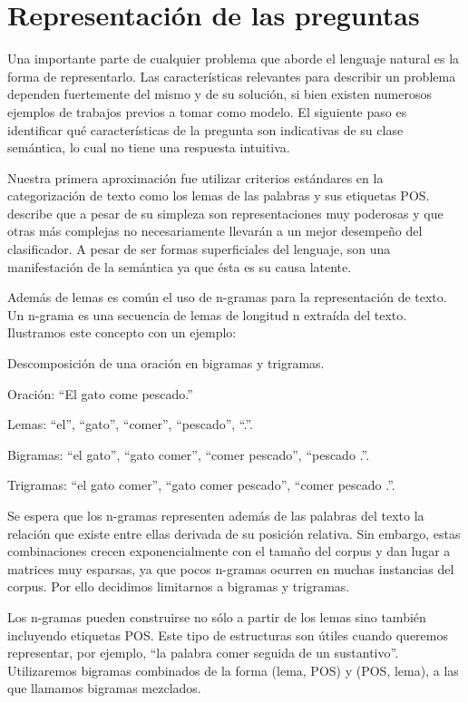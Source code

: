 \chapter{Representación de las preguntas}\label{capitulo-features}

Una importante parte de cualquier problema que aborde el lenguaje natural es la forma de representarlo. Las características relevantes para describir un problema dependen fuertemente del mismo y de su solución, si bien existen numerosos ejemplos de trabajos previos a tomar como modelo. El siguiente paso es identificar qué características de la pregunta son indicativas de su clase semántica, lo cual no tiene una respuesta intuitiva.

Nuestra primera aproximación fue utilizar criterios estándares en la categorización de texto como los lemas de las palabras y sus etiquetas POS. \citet{Sebastiani-text-categorization} describe que a pesar de su simpleza son representaciones muy poderosas y que otras más complejas no necesariamente llevarán a un mejor desempeño del clasificador. A pesar de ser formas superficiales del lenguaje, son una manifestación de la semántica ya que ésta es su causa latente.

Además de lemas es común el uso de n-gramas para la representación de texto. Un n-grama es una secuencia de lemas de longitud n extraída del texto. Ilustramos este concepto con un ejemplo:

\begin{example} Descomposición de una oración en bigramas y trigramas.

Oración: ``El gato come pescado.''

Lemas: ``el'', ``gato'', ``comer'', ``pescado'', ``.''.

Bigramas: ``el gato'', ``gato comer'', ``comer pescado'', ``pescado .''.

Trigramas: ``el gato comer'', ``gato comer pescado'', ``comer pescado .''.

\end{example}

Se espera que los n-gramas representen además de las palabras del texto la relación que existe entre ellas derivada de su posición relativa. Sin embargo, estas combinaciones crecen exponencialmente con el tamaño del corpus y dan lugar a matrices muy esparsas, ya que pocos n-gramas ocurren en muchas instancias del corpus. Por ello decidimos limitarnos a bigramas y trigramas.

Los n-gramas pueden construirse no sólo a partir de los lemas sino también incluyendo etiquetas POS. Este tipo de estructuras son útiles cuando queremos representar, por ejemplo, ``la palabra comer seguida de un sustantivo''. Utilizaremos bigramas combinados de la forma (lema, POS) y (POS, lema), a las que llamamos bigramas mezclados.

